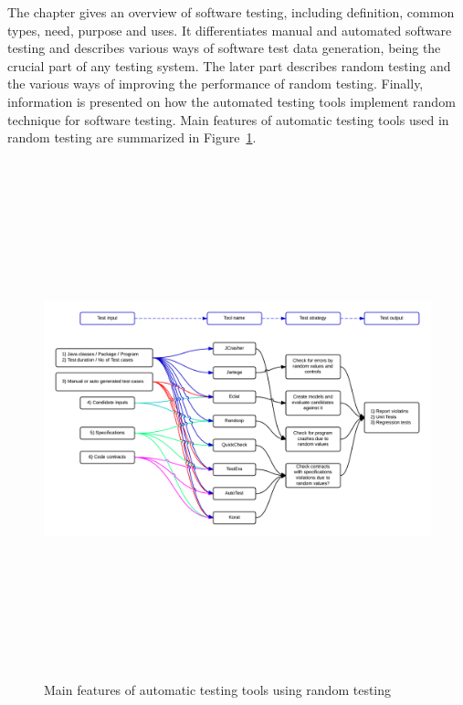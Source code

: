 The chapter gives an overview of software testing, including definition, common types, need, purpose and uses. It differentiates manual and automated software testing and describes various ways of software test data generation, being the crucial part of any testing system. The later part describes random testing and the various ways of improving the performance of random testing. Finally, information is presented on how the automated testing tools implement random technique for software testing. Main features of automatic testing tools used in random testing are summarized in Figure~\ref{fig:Tools}.

\begin{figure}[H]
	\centering
	\centerline{\includegraphics[width=17.5cm, height=15cm]{chapter2/RandomTools1.png}}
	\caption{Main features of automatic testing tools using random testing}
	\label{fig:Tools}
\end{figure}







